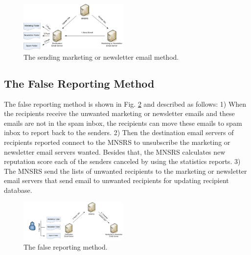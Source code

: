 \documentclass[conference]{IEEEtran}
\begin{document}
\begin{figure}
\centering
\includegraphics[width=0.48\textwidth]{4.pdf}
\caption{The sending marketing or newsletter email method.} 
\label{fig:SendingMethod}
\end{figure}

\subsection{The False Reporting Method}
The false reporting method is
shown in Fig. \ref{fig:FaultReportingMethod} and described as follows:
1) When the recipients receive the unwanted marketing or newsletter emails and these emails are not in the spam inbox, the recipients can move these emails to spam inbox to report back to the senders.
2) Then the destination email servers of recipients reported connect to the MNSRS to unsubscribe the marketing or newsletter email servers wanted.
%
Besides that, the MNSRS calculates new reputation score each of the senders canceled by using the statistics reports.
3) The MNSRS send the lists of unwanted recipients to the marketing or newsletter email servers that send email to unwanted recipients for updating recipient database. 

\begin{figure}
\centering
\includegraphics[width=0.48\textwidth]{5.pdf}
\caption{The false reporting method.}
\label{fig:FaultReportingMethod}
\end{figure}
\end{document}
